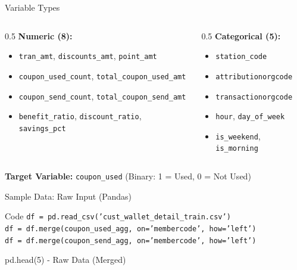 \documentclass[aspectratio=169]{beamer}
\begin{document}
\begin{frame}{Variable Types}
\begin{columns}
\begin{column}{0.5\textwidth}
\textbf{Numeric (8):}
\begin{itemize}
    \item \texttt{tran\_amt}, \texttt{discounts\_amt}, \texttt{point\_amt}
    \item \texttt{coupon\_used\_count}, \texttt{total\_coupon\_used\_amt}
    \item \texttt{coupon\_send\_count}, \texttt{total\_coupon\_send\_amt}
    \item \texttt{benefit\_ratio}, \texttt{discount\_ratio}, \texttt{savings\_pct}
\end{itemize}
\end{column}
\begin{column}{0.5\textwidth}
\textbf{Categorical (5):}
\begin{itemize}
    \item \texttt{station\_code}
    \item \texttt{attributionorgcode}
    \item \texttt{transactionorgcode}
    \item \texttt{hour}, \texttt{day\_of\_week}
    \item \texttt{is\_weekend}, \texttt{is\_morning}
\end{itemize}
\end{column}
\end{columns}

\textbf{Target Variable:} \texttt{coupon\_used} (Binary: 1 = Used, 0 = Not Used)
\end{frame}

\begin{frame}{Sample Data: Raw Input (Pandas)}
\bigskip
\bigskip
\begin{block}{Code}
\texttt{df = pd.read\_csv('cust\_wallet\_detail\_train.csv')}\\
\texttt{df = df.merge(coupon\_used\_agg, on='membercode', how='left')}\\
\texttt{df = df.merge(coupon\_send\_agg, on='membercode', how='left')}
\end{block}
\bigskip
\begin{block}{pd.head(5) - Raw Data (Merged)}
\lstset{style=pandas}

\end{block}
\end{frame}
\end{document}
